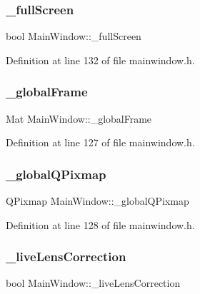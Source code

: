\subsubsection{\texorpdfstring{\_fullScreen}{\_fullScreen}}
{\footnotesize\ttfamily bool Main\+Window\+::\+\_\+full\+Screen\hspace{0.3cm}{\ttfamily [private]}}



Definition at line 132 of file mainwindow.\+h.

\mbox{\label{classMainWindow_a69d1e60b19121dcf294a0b3085c18b31}} 
\subsubsection{\texorpdfstring{\_globalFrame}{\_globalFrame}}
{\footnotesize\ttfamily Mat Main\+Window\+::\+\_\+global\+Frame\hspace{0.3cm}{\ttfamily [private]}}



Definition at line 127 of file mainwindow.\+h.

\mbox{\label{classMainWindow_a9519bc24e6ce9e25bbfb4c9b71e34fb4}} 
\subsubsection{\texorpdfstring{\_globalQPixmap}{\_globalQPixmap}}
{\footnotesize\ttfamily Q\+Pixmap Main\+Window\+::\+\_\+global\+Q\+Pixmap\hspace{0.3cm}{\ttfamily [private]}}



Definition at line 128 of file mainwindow.\+h.

\mbox{\label{classMainWindow_a7e80d766f1aecdcf4385f7d1b7fb0fa0}} 
\subsubsection{\texorpdfstring{\_liveLensCorrection}{\_liveLensCorrection}}
{\footnotesize\ttfamily bool Main\+Window\+::\+\_\+live\+Lens\+Correction\hspace{0.3cm}{\ttfamily [private]}}




